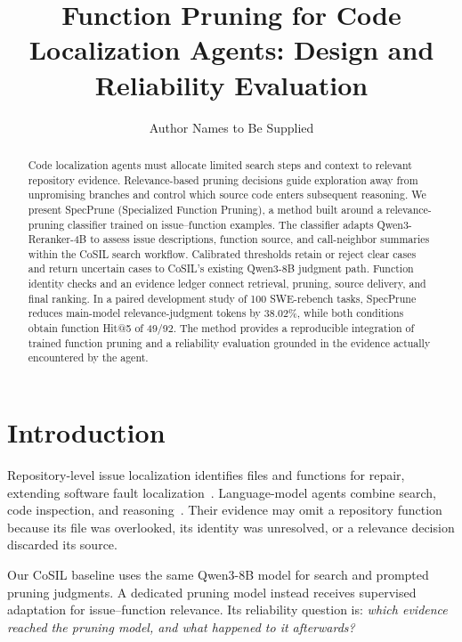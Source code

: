 \documentclass{svproc}
\begin{document}
\mainmatter
\title{Function Pruning for Code Localization Agents: Design and Reliability Evaluation}
\author{Author Names to Be Supplied}
\maketitle

\begin{abstract}
Code localization agents must allocate limited search steps and context to relevant repository evidence. Relevance-based pruning decisions guide exploration away from unpromising branches and control which source code enters subsequent reasoning. We present SpecPrune (Specialized Function Pruning), a method built around a relevance-pruning classifier trained on issue--function examples. The classifier adapts Qwen3-Reranker-4B to assess issue descriptions, function source, and call-neighbor summaries within the CoSIL search workflow. Calibrated thresholds retain or reject clear cases and return uncertain cases to CoSIL's existing Qwen3-8B judgment path. Function identity checks and an evidence ledger connect retrieval, pruning, source delivery, and final ranking. In a paired development study of 100 SWE-rebench tasks, SpecPrune reduces main-model relevance-judgment tokens by 38.02\%, while both conditions obtain function Hit@5 of 49/92. The method provides a reproducible integration of trained function pruning and a reliability evaluation grounded in the evidence actually encountered by the agent.
\end{abstract}

\section{Introduction}
Repository-level issue localization identifies files and functions for repair, extending software fault localization~\cite{wong2016survey}. Language-model agents combine search, code inspection, and reasoning~\cite{cosil2025,swebench2024}. Their evidence may omit a repository function because its file was overlooked, its identity was unresolved, or a relevance decision discarded its source.

Our CoSIL baseline uses the same Qwen3-8B model for search and prompted pruning judgments. A dedicated pruning model instead receives supervised adaptation for issue--function relevance. Its reliability question is: \emph{which evidence reached the pruning model, and what happened to it afterwards?}
\end{document}
